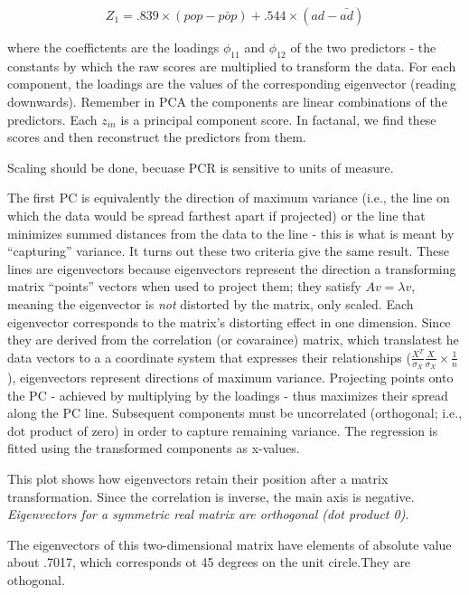 \documentclass[
]{article}
\begin{document}
\[Z_1 = .839\times(pop - \bar{pop}) + .544\times(ad - \bar{ad})\]

where the coeffictents are the loadings \(\phi_{11}\) and \(\phi_{12}\)
of the two predictors - the constants by which the raw scores are
multiplied to transform the data. For each component, the loadings are
the values of the corresponding eigenvector (reading downwards).
Remember in PCA the components are linear combinations of the
predictors. Each \(z_{in}\) is a principal component score. In factanal,
we find these scores and then reconstruct the predictors from them.

Scaling should be done, becuase PCR is sensitive to units of measure.

The first PC is equivalently the direction of maximum variance (i.e.,
the line on which the data would be spread farthest apart if projected)
or the line that minimizes summed distances from the data to the line -
this is what is meant by ``capturing'' variance. It turns out these two
criteria give the same result. These lines are eigenvectors because
eigenvectors represent the direction a transforming matrix ``points''
vectors when used to project them; they satisfy \(Av =\lambda{v}\),
meaning the eigenvector is \emph{not} distorted by the matrix, only
scaled. Each eigenvector corresponds to the matrix's distorting effect
in one dimension. Since they are derived from the correlation (or
covaraince) matrix, which translatest he data vectors to a a coordinate
system that expresses their relationships
(\(\frac{X^T}{\sigma_{X}}\frac{X}{\sigma_{X}}\times \frac{1}{n}\)),
eigenvectors represent directions of maximum variance. Projecting points
onto the PC - achieved by multiplying by the loadings - thus maximizes
their spread along the PC line. Subsequent components must be
uncorrelated (orthogonal; i.e., dot product of zero) in order to capture
remaining variance. The regression is fitted using the transformed
components as x-values.

This plot shows how eigenvectors retain their position after a matrix
transformation. Since the correlation is inverse, the main axis is
negative. \emph{Eigenvectors for a symmetric real matrix are orthogonal
(dot product 0)}.

The eigenvectors of this two-dimensional matrix have elements of
absolute value about .7017, which corresponds ot 45 degrees on the unit
circle.They are othogonal.
\end{document}
